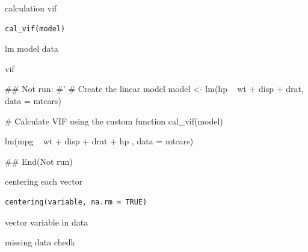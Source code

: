 \documentclass[a4paper]{book}
\begin{document}
%
\begin{Description}
calculation vif
\end{Description}
%
\begin{Usage}
\begin{verbatim}
cal_vif(model)
\end{verbatim}
\end{Usage}
%
\begin{Arguments}
\begin{ldescription}
\item[\code{model}] lm model data
\end{ldescription}
\end{Arguments}
%
\begin{Value}
vif
\end{Value}
%
\begin{Examples}
\begin{ExampleCode}

\#\# Not run: 
#'
# Create the linear model
model <- lm(hp ~ wt + disp + drat, data = mtcars)

# Calculate VIF using the custom function
cal_vif(model)

lm(mpg ~ wt + disp + drat + hp , data = mtcars) %



## End(Not run)
\end{ExampleCode}
\end{Examples}

%
\begin{Description}
centering each vector
\end{Description}
%
\begin{Usage}
\begin{verbatim}
centering(variable, na.rm = TRUE)
\end{verbatim}
\end{Usage}
%
\begin{Arguments}
\begin{ldescription}
\item[\code{variable}] vector variable in data

\item[\code{na.rm}] missing data chedk
\end{ldescription}
\end{Arguments}
\end{document}
